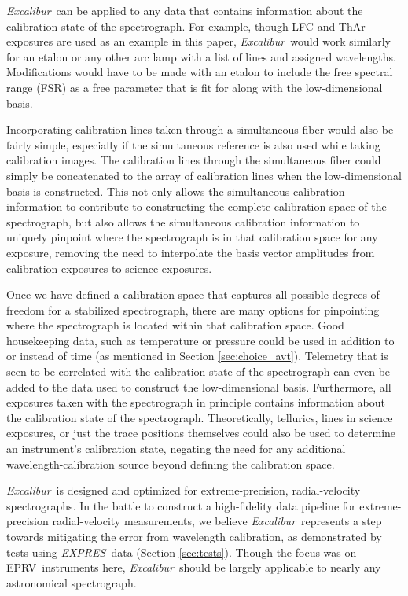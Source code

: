 \documentclass[modern]{aastex63}
\newcommand{\project}[1]{\textsl{#1}}
\newcommand{\name}{\project{Excalibur}}
\newcommand{\acronym}[1]{{\small{#1}}}
\newcommand{\expres}{\project{\acronym{EXPRES}}}
\newcommand{\eprv}{\acronym{EPRV}}
\begin{document}
\name\ can be applied to any data that contains information about the calibration state of the spectrograph.  For example, though LFC and ThAr exposures are used as an example in this paper, \name\ would work similarly for an etalon or any other arc lamp with a list of lines and assigned wavelengths.  Modifications would have to be made with an etalon to include the free spectral range (FSR) as a free parameter that is fit for along with the low-dimensional basis.

Incorporating calibration lines taken through a simultaneous fiber would also be fairly simple, especially if the simultaneous reference is also used while taking calibration images.  The calibration lines through the simultaneous fiber could simply be concatenated to the array of calibration lines when the low-dimensional basis is constructed.  This not only allows the simultaneous calibration information to contribute to constructing the complete calibration space of the spectrograph, but also allows the simultaneous calibration information to uniquely pinpoint where the spectrograph is in that calibration space for any exposure, removing the need to interpolate the basis vector amplitudes from calibration exposures to science exposures.

Once we have defined a calibration space that captures all possible degrees of freedom for a stabilized spectrograph, there are many options for pinpointing where the spectrograph is located within that calibration space.  Good housekeeping data, such as temperature or pressure could be used in addition to or instead of time (as mentioned in Section \ref{sec:choice_avt}).  Telemetry that is seen to be correlated with the calibration state of the spectrograph can even be added to the data used to construct the low-dimensional basis.  Furthermore, all exposures taken with the spectrograph in principle contains information about the calibration state of the spectrograph.  Theoretically, tellurics, lines in science exposures, or just the trace positions themselves could also be used to determine an instrument's calibration state, negating the need for any additional wavelength-calibration source beyond defining the calibration space.

\name\ is designed and optimized for extreme-precision, radial-velocity spectrographs.  In the battle to construct a high-fidelity data pipeline for extreme-precision radial-velocity measurements, we believe \name\ represents a step towards mitigating the error from wavelength calibration, as demonstrated by tests using \expres\ data (Section \ref{sec:tests}).  Though the focus was on \eprv\ instruments here, \name\ should be largely applicable to nearly any astronomical spectrograph.
\end{document}
